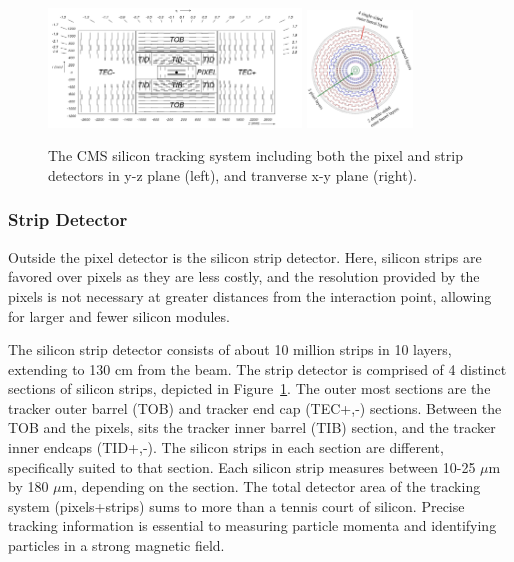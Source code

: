 \begin{figure}[hbtp]
 \begin{center}
   \includegraphics[width=0.6\textwidth]{ch3_figs/tracker_yz.pdf}
   \includegraphics[width=0.25\textwidth]{ch3_figs/tracker_transverse_layers.pdf}
   \caption{The CMS silicon tracking system including both the pixel and strip detectors in y-z plane (left), and tranverse x-y plane (right).}
   \label{fig:cms_tracker}
 \end{center}
\end{figure}

\subsubsection{Strip Detector}
Outside the pixel detector is the silicon strip detector. Here, silicon strips are favored over pixels as they are less costly, and the resolution provided by the pixels
is not necessary at greater distances from the interaction point, allowing for larger and fewer silicon modules. 

The silicon strip detector consists of about 10 million strips in 10 layers, extending to 130 cm from the beam. 
The strip detector is comprised of 4 distinct sections of silicon strips, depicted in
Figure~\ref{fig:cms_tracker}. The outer most sections are the tracker outer barrel (TOB) and tracker end cap (TEC+,-) sections. Between the TOB and the pixels, sits the tracker
inner barrel (TIB) section, and the tracker inner endcaps (TID+,-). The silicon strips in each section are different, specifically suited to that section.
Each silicon strip measures between 10-25 $\mu$m by 180 $\mu$m, depending on the section. The total detector area of the tracking system (pixels+strips) sums to more than
a tennis court of silicon. Precise tracking information is essential to measuring particle momenta and identifying particles in a strong magnetic field.

